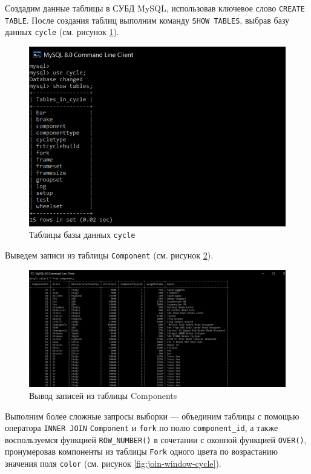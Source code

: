 \documentclass[a4paper,14pt]{extarticle}
\begin{document}
\newpage\hfill\newpage\hfill\newpage

Создадим данные таблицы в СУБД MySQL, использовав ключевое слово \texttt{CREATE TABLE}. После создания таблиц выполним команду \texttt{SHOW TABLES}, выбрав базу данных \texttt{cycle} (см. рисунок \ref{fig:show-tables-cycle}).

\begin{figure}[h!]
	\centering
	\includegraphics[width=0.7\linewidth]{images/show-tables-cycle}
	\caption{Таблицы базы данных \texttt{cycle}}
	\label{fig:show-tables-cycle}
\end{figure}


Выведем записи из таблицы \texttt{Component} (см. рисунок \ref{fig:select-components}).

\begin{figure}[h!]
	\centering
	\includegraphics[width=0.7\linewidth]{images/select-components}
	\caption{Вывод записей из таблицы Components}
	\label{fig:select-components}
\end{figure}


Выполним более сложные запросы выборки --- объединим таблицы с помощью оператора \texttt{INNER JOIN} \texttt{Component} и \texttt{fork} по полю \linebreak \texttt{component\_id}, а также воспользуемся функцией \texttt{ROW\_NUMBER()} в сочетании с оконной функцией \texttt{OVER()}, пронумеровав компоненты из таблицы \texttt{Fork} одного цвета по возрастанию значения поля \texttt{color} (см. рисунок \ref{fig:join-window-cycle}).
\end{document}
